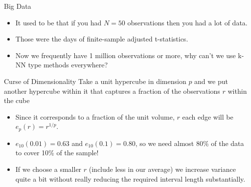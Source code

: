 \begin{frame}{Big Data}
  \begin{itemize}
  \item It used to be that if you had $N=50$ observations then you had a lot of data.
  \item Those were the days of finite-sample adjusted t-statistics.
  \item Now we frequently have 1 million observations or more, why can't we use k-NN type methods everywhere?
  \end{itemize}
\end{frame}
  
\begin{frame}{Curse of Dimensionality}
  Take a unit hypercube in dimension $p$ and we put another hypercube within it that captures a fraction of the observations $r$ within the cube
  \begin{itemize}
  \item Since it corresponds to a fraction of the unit volume, $r$ each edge  will be $e_p(r) = r^{1/p}$.
  \item $e_{10}(0.01) = 0.63$ and $e_{10}(0.1) = 0.80$, so we need almost 80\% of the data to cover 10\% of the sample!
  \item If we choose a smaller $r$ (include less in our average) we increase variance quite a bit without really reducing the required interval length substantially.
  \end{itemize}
\end{frame}
  
